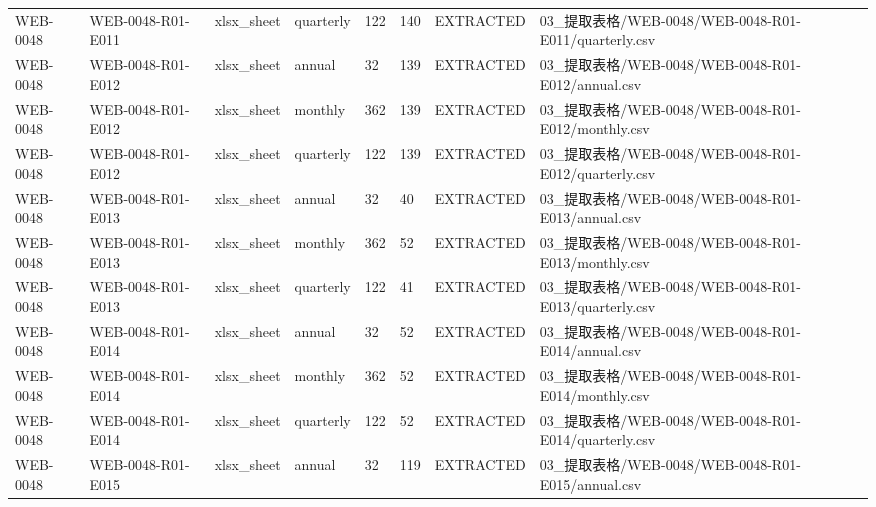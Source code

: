 \begin{landscape}
\begin{longtable}{p{1.8cm}p{2.2cm}p{3.1cm}p{4.7cm}p{1.3cm}p{1.3cm}p{3.0cm}p{5.3cm}}
WEB-0048 & WEB-0048-R01-E011 & xlsx\_\allowbreak{}sheet & quarterly & 122 & 140 & EXTRACTED & 03\_\allowbreak{}提取表格/\allowbreak{}WEB-0048/\allowbreak{}WEB-0048-R01-E011/\allowbreak{}quarterly.csv\\
WEB-0048 & WEB-0048-R01-E012 & xlsx\_\allowbreak{}sheet & annual & 32 & 139 & EXTRACTED & 03\_\allowbreak{}提取表格/\allowbreak{}WEB-0048/\allowbreak{}WEB-0048-R01-E012/\allowbreak{}annual.csv\\
WEB-0048 & WEB-0048-R01-E012 & xlsx\_\allowbreak{}sheet & monthly & 362 & 139 & EXTRACTED & 03\_\allowbreak{}提取表格/\allowbreak{}WEB-0048/\allowbreak{}WEB-0048-R01-E012/\allowbreak{}monthly.csv\\
WEB-0048 & WEB-0048-R01-E012 & xlsx\_\allowbreak{}sheet & quarterly & 122 & 139 & EXTRACTED & 03\_\allowbreak{}提取表格/\allowbreak{}WEB-0048/\allowbreak{}WEB-0048-R01-E012/\allowbreak{}quarterly.csv\\
WEB-0048 & WEB-0048-R01-E013 & xlsx\_\allowbreak{}sheet & annual & 32 & 40 & EXTRACTED & 03\_\allowbreak{}提取表格/\allowbreak{}WEB-0048/\allowbreak{}WEB-0048-R01-E013/\allowbreak{}annual.csv\\
WEB-0048 & WEB-0048-R01-E013 & xlsx\_\allowbreak{}sheet & monthly & 362 & 52 & EXTRACTED & 03\_\allowbreak{}提取表格/\allowbreak{}WEB-0048/\allowbreak{}WEB-0048-R01-E013/\allowbreak{}monthly.csv\\
WEB-0048 & WEB-0048-R01-E013 & xlsx\_\allowbreak{}sheet & quarterly & 122 & 41 & EXTRACTED & 03\_\allowbreak{}提取表格/\allowbreak{}WEB-0048/\allowbreak{}WEB-0048-R01-E013/\allowbreak{}quarterly.csv\\
WEB-0048 & WEB-0048-R01-E014 & xlsx\_\allowbreak{}sheet & annual & 32 & 52 & EXTRACTED & 03\_\allowbreak{}提取表格/\allowbreak{}WEB-0048/\allowbreak{}WEB-0048-R01-E014/\allowbreak{}annual.csv\\
WEB-0048 & WEB-0048-R01-E014 & xlsx\_\allowbreak{}sheet & monthly & 362 & 52 & EXTRACTED & 03\_\allowbreak{}提取表格/\allowbreak{}WEB-0048/\allowbreak{}WEB-0048-R01-E014/\allowbreak{}monthly.csv\\
WEB-0048 & WEB-0048-R01-E014 & xlsx\_\allowbreak{}sheet & quarterly & 122 & 52 & EXTRACTED & 03\_\allowbreak{}提取表格/\allowbreak{}WEB-0048/\allowbreak{}WEB-0048-R01-E014/\allowbreak{}quarterly.csv\\
WEB-0048 & WEB-0048-R01-E015 & xlsx\_\allowbreak{}sheet & annual & 32 & 119 & EXTRACTED & 03\_\allowbreak{}提取表格/\allowbreak{}WEB-0048/\allowbreak{}WEB-0048-R01-E015/\allowbreak{}annual.csv\\

\end{longtable}
\end{landscape}
